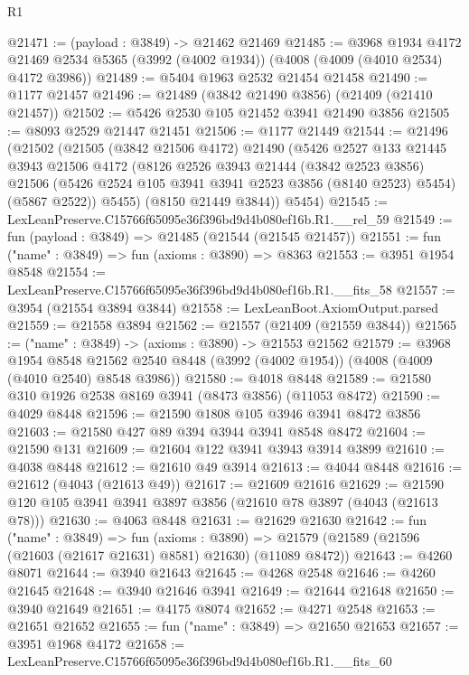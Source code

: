 \begin{lexlean}{R1}
\begin{coremodule}
@21471 := (payload : @3849) -> @21462 @21469
@21485 := @3968
    @1934
    @4172
    @21469
    @2534
    @5365
    (@3992 (@4002 @1934))
    (@4008 (@4009 (@4010 @2534) @4172 @3986))
@21489 := @5404 @1963 @2532 @21454 @21458
@21490 := @1177 @21457
@21496 := @21489 (@3842 @21490 @3856) (@21409 (@21410 @21457))
@21502 := @5426 @2530 @105 @21452 @3941 @21490 @3856
@21505 := @8093 @2529 @21447 @21451
@21506 := @1177 @21449
@21544 := @21496
    (@21502
      (@21505
        (@3842 @21506 @4172)
        @21490
        (@5426
          @2527
          @133
          @21445
          @3943
          @21506
          @4172
          (@8126
            @2526
            @3943
            @21444
            (@3842 @2523 @3856)
            @21506
            (@5426 @2524 @105 @3941 @3941 @2523 @3856 (@8140 @2523) @5454)
            (@5867 @2522))
          @5455)
        (@8150 @21449 @3844))
      @5454)
@21545 := LexLeanPreserve.C15766f65095e36f396bd9d4b080ef16b.R1.__rel_59
@21549 := fun (payload : @3849) => @21485 (@21544 (@21545 @21457))
@21551 := fun ("name" : @3849) => fun (axioms : @3890) => @8363
@21553 := @3951 @1954 @8548
@21554 := LexLeanPreserve.C15766f65095e36f396bd9d4b080ef16b.R1.__fits_58
@21557 := @3954 (@21554 @3894 @3844)
@21558 := LexLeanBoot.AxiomOutput.parsed
@21559 := @21558 @3894
@21562 := @21557 (@21409 (@21559 @3844))
@21565 := ("name" : @3849) -> (axioms : @3890) -> @21553 @21562
@21579 := @3968
    @1954
    @8548
    @21562
    @2540
    @8448
    (@3992 (@4002 @1954))
    (@4008 (@4009 (@4010 @2540) @8548 @3986))
@21580 := @4018 @8448
@21589 := @21580 @310 @1926 @2538 @8169 @3941 (@8473 @3856) (@11053 @8472)
@21590 := @4029 @8448
@21596 := @21590 @1808 @105 @3946 @3941 @8472 @3856
@21603 := @21580 @427 @89 @394 @3944 @3941 @8548 @8472
@21604 := @21590 @131
@21609 := @21604 @122 @3941 @3943 @3914 @3899
@21610 := @4038 @8448
@21612 := @21610 @49 @3914
@21613 := @4044 @8448
@21616 := @21612 (@4043 (@21613 @49))
@21617 := @21609 @21616
@21629 := @21590 @120 @105 @3941 @3941 @3897 @3856 (@21610 @78 @3897 (@4043 (@21613 @78)))
@21630 := @4063 @8448
@21631 := @21629 @21630
@21642 := fun ("name" : @3849) =>
  fun (axioms : @3890) =>
  @21579 (@21589 (@21596 (@21603 (@21617 @21631) @8581) @21630) (@11089 @8472))
@21643 := @4260 @8071
@21644 := @3940 @21643
@21645 := @4268 @2548
@21646 := @4260 @21645
@21648 := @3940 @21646 @3941
@21649 := @21644 @21648
@21650 := @3940 @21649
@21651 := @4175 @8074
@21652 := @4271 @2548
@21653 := @21651 @21652
@21655 := fun ("name" : @3849) => @21650 @21653
@21657 := @3951 @1968 @4172
@21658 := LexLeanPreserve.C15766f65095e36f396bd9d4b080ef16b.R1.__fits_60

\end{coremodule}
\end{lexlean}

